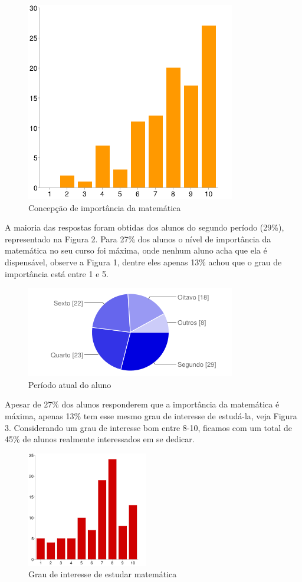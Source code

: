 \documentclass[12pt,a4paper]{article}
\begin{document}
\begin{figure}[!h]
\centering
\includegraphics[scale=0.4]{imagens/fig1.png} 
\caption{Concepção de importância da matemática }
\end{figure}

A maioria das respostas foram obtidas dos alunos do segundo período (29\%), representado na Figura 2. Para 27\% dos alunos o nível de importância da matemática no seu curso foi máxima, onde nenhum aluno acha que ela é dispensável, observe a Figura 1, dentre eles apenas 13\% achou que o grau de importância está entre 1 e 5. 

\begin{figure}[!h]
\centering
\includegraphics[scale=0.6]{imagens/fig2.png} 
\caption{Período atual do aluno }
\end{figure}

Apesar de 27\% dos alunos responderem que a importância da matemática é máxima, apenas 13\% tem esse mesmo grau de interesse de estudá-la, veja Figura 3. Considerando um grau de interesse bom entre 8-10, ficamos com um total de 45\% de alunos realmente interessados em se dedicar. 

\begin{figure}[!h]
\centering
\includegraphics[scale=0.65]{imagens/fig3.png} 
\caption{Grau de interesse de estudar matemática}
\end{figure}
\end{document}
